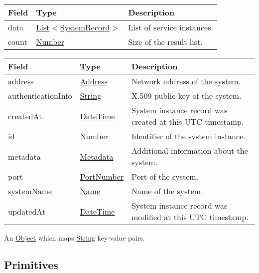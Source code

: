 \documentclass[a4paper]{arrowhead}
\newcommand{\pref}[1]{{\textcolor{ArrowheadGrey}{\hyperref[sec:model:primitives:#1]{#1}}}}
\begin{document}
\label{sec:model:SystemListResponse}

\begin{table}[ht!]
\begin{tabularx}{\textwidth}{| p{4.25cm} | p{3.5cm} | X |} \hline
\rowcolor{gray!33} Field & Type      & Description \\ \hline
data & \pref{List}$<$\hyperref[sec:model:SystemRecord]{SystemRecord}$>$     & List of service instances. \\ \hline
count & \pref{Number} & Size of the result list. \\ \hline
\end{tabularx}
\end{table}

\label{sec:model:SystemRecord}

\begin{table}[ht!]
\begin{tabularx}{\textwidth}{| p{4.25cm} | p{3.5cm} | X |} \hline
\rowcolor{gray!33} Field & Type & Description \\ \hline

address &\pref{Address} & Network address of the system. \\ \hline
authenticationInfo &\pref{String} & X.509 public key of the system. \\ \hline
createdAt & \pref{DateTime} & System instance record was created at this UTC time\-stamp. \\ \hline
id & \pref{Number} & Identifier of the system instance. \\ \hline
metadata &\hyperref[sec:model:Metadata]{Metadata} & Additional information about the system. \\ \hline
port &\pref{PortNumber} & Port of the system. \\ \hline
systemName &\pref{Name} & Name of the system. \\ \hline
updatedAt & \pref{DateTime} & System instance record was modified at this UTC time\-stamp. \\ \hline
\end{tabularx}
\end{table}

\label{sec:model:Metadata}

An \pref{Object} which maps \pref{String} key-value pairs.

\subsection{Primitives}
\label{sec:model:primitives}
\end{document}
